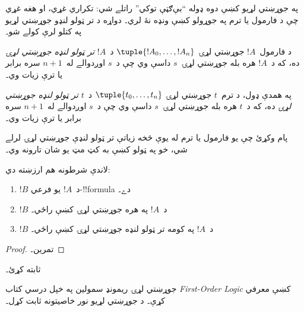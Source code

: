 \documentclass[../../../include/open-logic-section]{subfiles}
\begin{document}
په جوړښتي لړيو کښې دوه ډوله ``بې‌ګټې توکي'' راتلے شي: تکراري غړي، او
هغه غړي چې د فارمول يا ترم په جوړولو کښې ونډه نۀ لري۔ دواړه د تر ټولو
لنډو جوړښتي لړيو په کتلو لرې کولے شو۔

\begin{defn}
د فارمول~$!A$ جوړښتي لړۍ $\tuple{!A_0, \ldots, !A_n}$ د~$!A$
\emph{تر ټولو لنډه جوړښتي لړۍ} ده، که د~$!A$ هره بله جوړښتي
لړۍ~$s$ داسې وي چې د~$s$ اوږدوالے له~$n+1$ سره برابر يا ترې زيات وي۔

په همدې ډول، د ترم~$t$ جوړښتي لړۍ $\tuple{t_0, \ldots, t_n}$ د~$t$
\emph{تر ټولو لنډه جوړښتي لړۍ} ده، که د~$t$ هره بله جوړښتي
لړۍ~$s$ داسې وي چې د~$s$ اوږدوالے له~$n+1$ سره برابر يا ترې زيات وي۔
\end{defn}

پام وکړئ چې يو فارمول يا ترم له يوې څخه زياتې تر ټولو لنډې جوړښتي لړۍ
لرلے شي، خو په ټولو کښې به کټ مټ يو شان تارونه وي۔

\begin{prop}
لاندې شرطونه هم ارزښته دي:
\begin{enumerate}
    \item $!B$ د~$!A$ يو فرعي-!!{formula} دے۔
    \item $!B$ د~$!A$ په هره جوړښتي لړۍ کښې راځي۔
    \item $!B$ د~$!A$ په کومه تر ټولو لنډه جوړښتي لړۍ کښې راځي۔
\end{enumerate}
\end{prop}

\begin{proof}
تمرين۔
\end{proof}

\begin{prob}
 ثابته کړئ۔
\end{prob}

\begin{history}
جوړښتي لړۍ ريمونډ سمولين په خپل درسي کتاب
\emph{First-Order Logic} \citep{Smullyan1968} کښې معرفي کړې۔
د جوړښتي لړيو نور خاصيتونه \citet{Zuckerman1973} ثابت کړل۔
\end{history}
\end{document}
